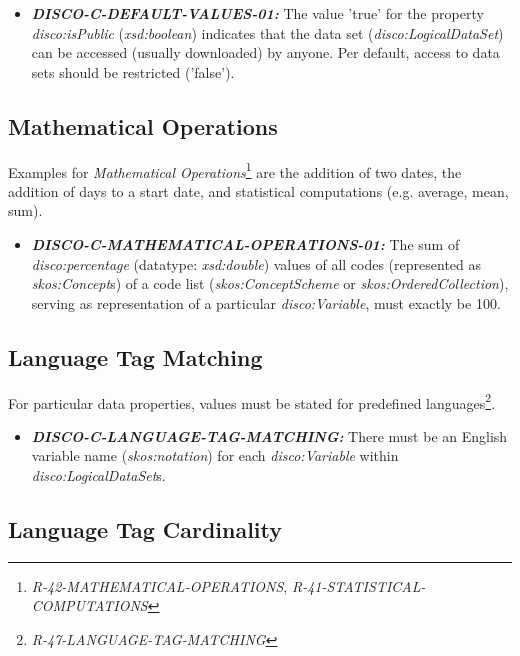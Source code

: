 \documentclass{llncs}
\begin{document}
\begin{itemize}
	\item \textbf{{\em DISCO-C-DEFAULT-VALUES-01:}}
The value 'true' for the property {\em disco:isPublic} ({\em xsd:boolean}) indicates that the data set ({\em disco:LogicalDataSet}) can be accessed (usually downloaded) by anyone.
Per default, access to data sets should be restricted ('false').
\end{itemize}







\subsection{Mathematical Operations}

Examples for {\em Mathematical Operations}\footnote{{\em R-42-MATHEMATICAL-OPERATIONS}, {\em R-41-STATISTICAL-COMPUTATIONS}} are the addition of two dates, the addition of days to a start date, and statistical computations (e.g. average, mean, sum).

\begin{itemize}
	\item \textbf{{\em DISCO-C-MATHEMATICAL-OPERATIONS-01:}}
The sum of {\em disco:percentage} (datatype: {\em xsd:double}) values of all codes (represented as {\em skos:Concept}s) of a code list ({\em skos:ConceptScheme} or {\em skos:OrderedCollection}), serving as representation of a particular {\em disco:Variable}, must exactly be 100.
\end{itemize}

\subsection{Language Tag Matching}

For particular data properties, values must be stated for predefined languages\footnote{{\em R-47-LANGUAGE-TAG-MATCHING}}.

\begin{itemize}
	\item \textbf{{\em DISCO-C-LANGUAGE-TAG-MATCHING:}}
There must be an English variable name ({\em skos:notation}) for each {\em disco:Variable} within {\em disco:LogicalDataSet}s.
\end{itemize}

\subsection{Language Tag Cardinality}
\end{document}
